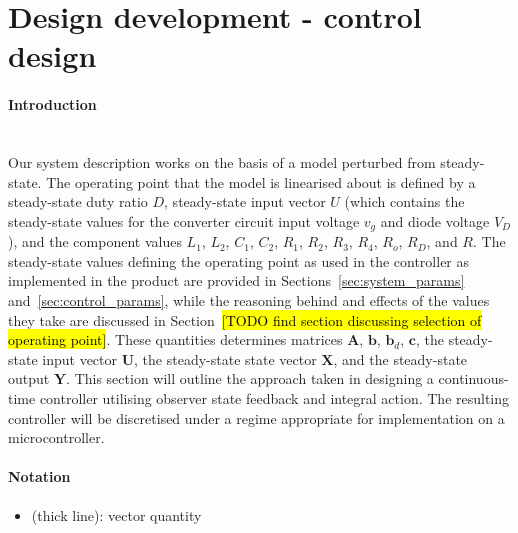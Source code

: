 \clearpage
\section{Design development - control design}\label{sec:controller}
\paragraph{Introduction}
~\\
Our system description works on the basis of a model perturbed from steady-state. The operating point that the model is linearised about is defined by a steady-state duty ratio $D$, steady-state input vector $U$ (which contains the steady-state values for the converter circuit input voltage $v_g$ and diode voltage $V_D$), and the component values $L_1$, $L_2$, $C_1$, $C_2$, $R_1$, $R_2$, $R_3$, $R_4$, $R_o$, $R_D$, and $R$.
\newpar
The steady-state values defining the operating point as used in the controller as implemented in the product are provided in Sections~\ref{sec:system_params} and~\ref{sec:control_params}, while the reasoning behind and effects of the values they take are discussed in Section~\hl{[TODO find section discussing selection of operating point]}.
\newpar
These quantities determines matrices $\boldsymbol{A}$, $\boldsymbol{b}$, $\boldsymbol{b}_d$, $\boldsymbol{c}$, the steady-state input vector $\boldsymbol{U}$, the steady-state state vector $\boldsymbol{X}$, and the steady-state output $\boldsymbol{Y}$.
\newpar
This section will outline the approach taken in designing a continuous-time controller utilising observer state feedback and integral action. The resulting controller will be discretised under a regime appropriate for implementation on a microcontroller.
\paragraph{Notation}
\begin{itemize}
    \item
        (thick line): vector quantity
\end{itemize}
